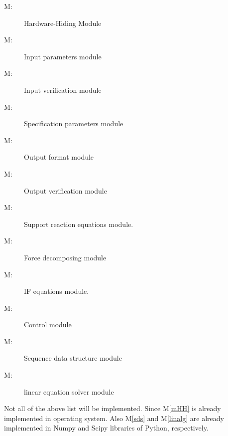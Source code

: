 \documentclass[12pt, titlepage]{article}
\newcounter{mnum}
\newcommand{\mthemnum}{M\themnum}
\begin{document}
\begin{description}
\item [ \mthemnum \label{mHH}:] Hardware-Hiding Module
\item [ \mthemnum \label{mIn}:] Input parameters module
\item [ \mthemnum \label{mparam}:] Input verification module
\item [ \mthemnum \label{mSpec}:] Specification parameters module 
\item [ \mthemnum \label{mout}:] Output format module
\item [ \mthemnum \label{mverify}:] Output verification module
\item [ \mthemnum \label{mreact}:] Support reaction equations module. 
\item [ \mthemnum \label{mdecomp}:] Force decomposing module
\item [ \mthemnum \label{minternal}:] \mbox{IF} equations module.
\item [ \mthemnum \label{mControl}:] Control module
\item [ \mthemnum \label{msds}:] Sequence data structure module
\item [ \mthemnum \label{mlinalg}:] linear equation solver module

\end{description} 
Not all of the above list will be implemented. Since M\ref{mHH} is already implemented in operating system. Also M\ref{sds} and  M\ref{linalg} are already implemented in Numpy and Scipy libraries of Python, respectively.
\end{document}
